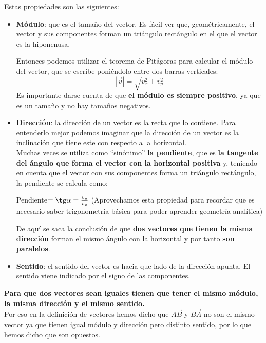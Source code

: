 \documentclass[a4paper,11pt,answers]{exam}
\begin{document}
Estas propiedades son las siguientes:
\begin{itemize}
\item \textbf{Módulo}: que es el tamaño del vector. Es fácil ver que, geométricamente, el vector y sus componentes forman un triángulo rectángulo en el que el vector es la hiponenusa.
  \begin{center}
  \end{center}
  Entonces podemos utilizar el teorema de Pitágoras para calcular el módulo del vector, que
  se escribe poniéndolo entre dos barras verticales:
  \[|\vec{v}| = \sqrt{v_x^2 + v_y^2}\]
  Es importante darse cuenta de que \textbf{el módulo es siempre positivo}, ya que es un tamaño
  y no hay tamaños negativos.
\item \textbf{Dirección}: la dirección de un vector es la recta que lo contiene. Para entenderlo
  mejor podemos imaginar que la dirección de un vector es la inclinación que tiene este con
  respecto a la horizontal.\\
  Muchas veces se utiliza como ``sinónimo'' \textbf{la pendiente}, que es \textbf{la tangente del
    ángulo que forma el vector con la horizontal positiva} y, teniendo en cuenta que el vector con sus
  componentes forma un triángulo rectángulo, la pendiente se calcula como:
  \begin{center}
    Pendiente$=\tg \alpha = \frac{v_y}{v_x}$
    \small{(Aprovechamos esta propiedad para recordar que es necesario saber
      trigonometría básica para poder aprender geometría analítica)}
  \end{center}
  De aquí se saca la conclusión de que \textbf{dos vectores que tienen la misma dirección} forman el
  mismo ángulo con la horizontal y por tanto \textbf{son paralelos}.
\item \textbf{Sentido}: el sentido del vector es hacia que lado de la dirección apunta. El sentido
  viene indicado por el signo de las componentes.
\end{itemize}

\textbf{Para que dos vectores sean iguales tienen que tener el mismo módulo, la misma dirección
  y el mismo sentido.}\\
Por eso en la definición de vectores hemos dicho que $\overrightarrow{AB}$ y $\overrightarrow{BA}$
no son el mismo vector ya que tienen igual módulo y dirección pero distinto sentido, por lo que
hemos dicho que son opuestos.
\end{document}
